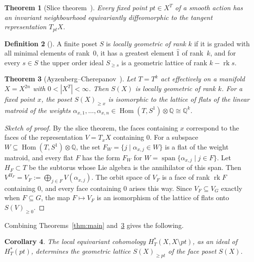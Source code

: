 \documentclass[11pt,a4paper]{article}
\numberwithin{equation}{section}
\theoremstyle{plain}
\newtheorem{theorem}{Theorem}[section]
\newtheorem{corollary}[theorem]{Corollary}
\theoremstyle{definition}
\newtheorem{definition}[theorem]{Definition}
\theoremstyle{remark}
\newcommand{\Q}{\mathbb{Q}}
\newcommand{\HT}{H^{*}_{T}}
\DeclareMathOperator{\rk}{rk}
\DeclareMathOperator{\Hom}{Hom}
\begin{document}
\begin{theorem}[Slice theorem~\cite{Bre72}]\label{thm:slice}
Every fixed point $pt\in X^T$ of a smooth action has an invariant neighbourhood equivariantly diffeomorphic to the tangent representation $T_{pt}X$.
\end{theorem}

\begin{definition}[{\cite[Def.~1.1]{AC22}}]
A finite poset $S$ is \emph{locally geometric of rank $k$} if it is graded with all minimal elements of rank~$0$, it has a greatest element $\hat1$ of rank~$k$, and for every $s\in S$ the upper order ideal $S_{\geqslant s}$ is a geometric lattice of rank $k-\rk s$.
\end{definition}

\begin{theorem}[Ayzenberg--Cherepanov~{\cite[Thm.~1]{AC22}}]\label{thm:AC}
Let $T=T^k$ act effectively on a manifold $X=X^{2n}$ with $0<|X^T|<\infty$. Then $S(X)$ is locally geometric of rank $k$. For a fixed point $x$, the poset $S(X)_{\geqslant x}$ is isomorphic to the lattice of flats of the linear matroid of the weights $\alpha_{x,1},\dots,\alpha_{x,n}\in\Hom(T,S^1)\otimes\Q\cong\Q^k$.
\end{theorem}
\begin{proof}[Sketch of proof]
By the slice theorem, the faces containing $x$ correspond to the faces of the representation $V=T_xX$ containing $0$. For a subspace $W\subseteq\Hom(T,S^1)\otimes\Q$, the set $F_W=\{j\mid\alpha_{x,j}\in W\}$ is a flat of the weight matroid, and every flat $F$ has the form $F_W$ for $W=\operatorname{span}\{\alpha_{x,j}\mid j\in F\}$. Let $H_F\subset T$ be the subtorus whose Lie algebra is the annihilator of this span. Then $V^{H_F}=V_F:=\bigoplus_{j\in F}V(\alpha_{x,j})$. The orbit space of $V_F$ is a face of rank $\rk F$ containing $0$, and every face containing $0$ arises this way. Since $V_F\subseteq V_G$ exactly when $F\subseteq G$, the map $F\mapsto V_F$ is an isomorphism of the lattice of flats onto $S(V)_{\geqslant0}$.
\end{proof}

Combining Theorems~\ref{thm:main} and~\ref{thm:AC} gives the following.

\begin{corollary}\label{cor:main}
The local equivariant cohomology $\HT(X,X\setminus pt)$, as an ideal of $\HT(pt)$, determines the geometric lattice $S(X)_{\geqslant pt}$ of the face poset $S(X)$.
\end{corollary}
\end{document}
